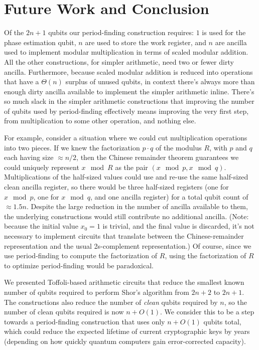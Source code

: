 \documentclass[twocolumn]{article}
\begin{document}
\section{Future Work and Conclusion} \label{sec:conclusion}

Of the $2n+1$ qubits our period-finding construction requires: $1$ is used for the phase estimation qubit, $n$ are used to store the work register, and $n$ are ancilla used to implement modular multiplication in terms of scaled modular addition.
All the other constructions, for simpler arithmetic, need two or fewer dirty ancilla.
Furthermore, because scaled modular addition is reduced into operations that have a $\Theta(n)$ surplus of unused qubits, in context there's always more than enough dirty ancilla available to implement the simpler arithmetic inline.
There's so much slack in the simpler arithmetic constructions that improving the number of qubits used by period-finding effectively means improving the very first step, from multiplication to some other operation, and nothing else.

For example, consider a situation where we could cut multiplication operations into two pieces.
If we knew the factorization $p \cdot q$ of the modulus $R$, with $p$ and $q$ each having size $\approx n/2$, then the Chinese remainder theorem guarantees we could uniquely represent $x \mod R$ as the pair $(x \mod p, x \mod q)$.
Multiplications of the half-sized values could use and re-use the same half-sized clean ancilla register, so there would be three half-sized registers (one for $x \mod p$, one for $x \mod q$, and one ancilla register) for a total qubit count of $\approx 1.5n$.
Despite the large reduction in the number of ancilla available to them, the underlying constructions would still contribute no additional ancilla.
(Note: because the initial value $x_0 = 1$ is trivial, and the final value is discarded, it's not necessary to implement circuits that translate between the Chinese-remainder representation and the usual 2s-complement representation.)
Of course, since we use period-finding to compute the factorization of $R$, using the factorization of $R$ to optimize period-finding would be paradoxical.

We presented Toffoli-based arithmetic circuits that reduce the smallest known number of qubits required to perform Shor's algorithm from $2n+2$ to $2n+1$.
The constructions also reduce the number of {\em clean} qubits required by $n$, so the number of clean qubits required is now $n + O(1)$.
We consider this to be a step towards a period-finding construction that uses only $n + O(1)$ qubits total, which could reduce the expected lifetime of current cryptographic keys by years (depending on how quickly quantum computers gain error-corrected capacity).




\end{document}
